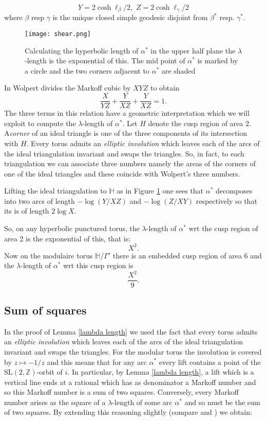 \documentclass[12pt,a4paper]{amsart}
\def\HH{\mathbb{H}}
\def\ZZ{\mathbb{Z}}
\def\sl2{\mathrm{SL}(2, \ZZ)}
\begin{document}
\begin{equation*}
Y = 2 \cosh \ell_\beta / 2 ,\,\, Z  = 2 \cosh \ell_\gamma / 2 
\end{equation*}
where $\beta$ resp $\gamma$ is the unique closed simple  geodesic disjoint from
$\beta^*$ resp. $\gamma^*$.

\begin{figure}[ht]
\begin{center}
\texttt{[image: shear.png]} 
\end{center}
\caption{Calculating the hyperbolic length of $\alpha^*$ in the upper half plane
the $\lambda$-length is the exponential of this.
The mid point of $\alpha^*$ is marked by a circle and
the two corners adjacent to $\alpha^*$ are shaded}
\label{penner}
\end{figure}

In  \cite{saw} Wolpert divides the Markoff cubic by $XYZ$ to obtain
$$\frac{X}{YZ} + \frac{Y}{XZ} + \frac{Y}{XZ} = 1.$$
The three terms in this relation have a geometric interpretation
which we will exploit to compute the $\lambda$-length of $\alpha^*$.
Let $H$ denote the cusp region of area $2$. 
A\textit{corner} of an ideal triangle is one of the 
three components of its intersection with $H$.
Every torus admits an \textit{elliptic involution}
which leaves each of the arcs of the ideal triangulation  invariant
 and swaps the triangles.
So, in fact, to each triangulation we can associate three numbers
namely the areas of the corners of one of the  ideal triangles
and these coincide with Wolpert's three numbers.

Lifting the ideal triangulation to $\HH$ as in Figure \ref{penner}
one sees that  $\alpha^*$ decomposes into two arcs of length
$-\log(Y/XZ)$ and $-\log(Z/XY)$ respectively
so that its is of length $2\log X$.

So, on any hyperbolic punctured torus,
the $\lambda$-length of $\alpha^*$ wrt the cusp region of area 2 is
the exponential of this, that is:
$$ X^2.$$
Now on the modulaire torus $\HH/\Gamma'$ there is an embedded cusp 
region of area 6 and the $\lambda$-length of $\alpha^*$ wrt this cusp region
is
$$ \frac{X^2}{9}.$$



\subsection{Sum of squares}\label{frobenius}


In the proof of Lemma \ref{lambda length} we used the fact that every torus
admits an \textit{elliptic involution} which leaves each of the arcs of the
ideal triangulation  invariant and swaps the triangles. For the modular torus
the involution is covered by $z \mapsto -1/z$ and  this means that for any arc
$\alpha^*$ every lift contains a point of the $\sl2$-orbit of $i$. In
particular, by Lemma \ref{lambda length}, a lift which is a vertical line ends
at a rational which has as denominator a Markoff number and so this Markoff
number is a sum of two squares. Conversely, every Markoff number arises as the
square of a $\lambda$-length of some arc  $\alpha^*$ and so must be the sum of
two squares. By extending this reasoning slightly (compare \cite{mcp} and
\cite{spring}) we obtain:
 
\end{document}

